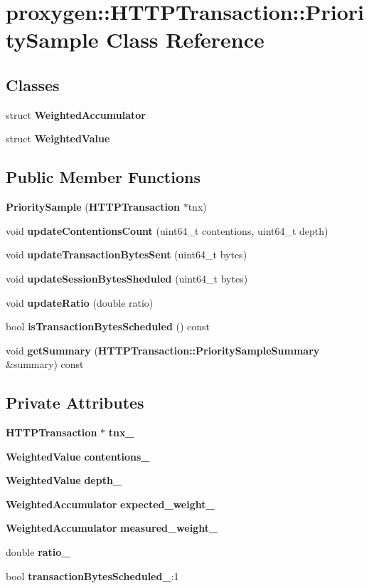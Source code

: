 \section{proxygen\+:\+:H\+T\+T\+P\+Transaction\+:\+:Priority\+Sample Class Reference}
\label{classproxygen_1_1HTTPTransaction_1_1PrioritySample}
\subsection*{Classes}
\begin{DoxyCompactItemize}
\item 
struct {\bf Weighted\+Accumulator}
\item 
struct {\bf Weighted\+Value}
\end{DoxyCompactItemize}
\subsection*{Public Member Functions}
\begin{DoxyCompactItemize}
\item 
{\bf Priority\+Sample} ({\bf H\+T\+T\+P\+Transaction} $\ast$tnx)
\item 
void {\bf update\+Contentions\+Count} (uint64\+\_\+t contentions, uint64\+\_\+t depth)
\item 
void {\bf update\+Transaction\+Bytes\+Sent} (uint64\+\_\+t bytes)
\item 
void {\bf update\+Session\+Bytes\+Sheduled} (uint64\+\_\+t bytes)
\item 
void {\bf update\+Ratio} (double ratio)
\item 
bool {\bf is\+Transaction\+Bytes\+Scheduled} () const 
\item 
void {\bf get\+Summary} ({\bf H\+T\+T\+P\+Transaction\+::\+Priority\+Sample\+Summary} \&summary) const 
\end{DoxyCompactItemize}
\subsection*{Private Attributes}
\begin{DoxyCompactItemize}
\item 
{\bf H\+T\+T\+P\+Transaction} $\ast$ {\bf tnx\+\_\+}
\item 
{\bf Weighted\+Value} {\bf contentions\+\_\+}
\item 
{\bf Weighted\+Value} {\bf depth\+\_\+}
\item 
{\bf Weighted\+Accumulator} {\bf expected\+\_\+weight\+\_\+}
\item 
{\bf Weighted\+Accumulator} {\bf measured\+\_\+weight\+\_\+}
\item 
double {\bf ratio\+\_\+}
\item 
bool {\bf transaction\+Bytes\+Scheduled\+\_\+}\+:1
\end{DoxyCompactItemize}


